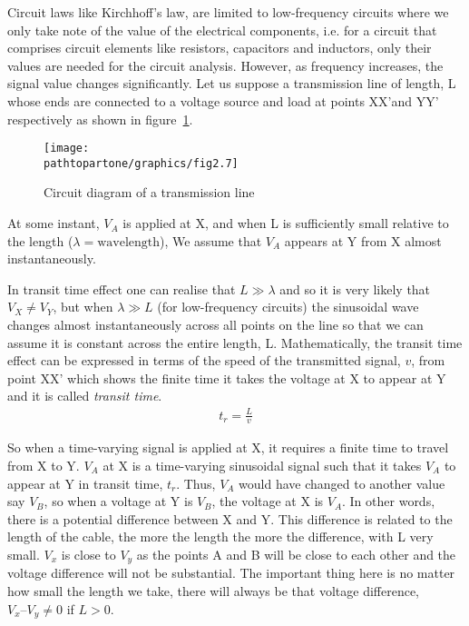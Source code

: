 Circuit laws like Kirchhoff’s law, are limited to low-frequency circuits where we only take note of the value of the electrical components, i.e. for a circuit that comprises circuit elements like resistors, capacitors and inductors, only their values are needed for the circuit analysis. However, as frequency increases, the signal value changes significantly. Let us suppose a transmission line of length, L whose ends are connected to a voltage source and load at points XX'and YY' respectively as shown in figure~\ref{fig:first}.
\begin{figure}[h]
\centering
\texttt{[image: \\pathtopartone/graphics/fig2.7]}
\caption{Circuit diagram of a transmission line}
\label{fig:first}
\end{figure}

At some instant, $ V_{A} $ is applied at X, and when L is sufficiently small relative to the length ($  \lambda = \text{wavelength} $), We assume that $ V_{A} $ appears at Y from X almost instantaneously.

In transit time effect one can realise that $ L \gg\lambda$ and so it is very likely that $ V_{X} \neq V_{Y} $, but when $  \lambda \gg L  $ (for low-frequency circuits) the sinusoidal wave changes almost instantaneously across all points on the line so that we can assume it is constant across the entire length, L. Mathematically, the transit time effect can be expressed in terms of the speed of the transmitted signal, $v$, from point XX' which shows the finite time it takes the voltage at X to appear at Y and it is called \textit{transit time}.
\begin{align}
t_{r} = \frac{L}{v}
\label{eqn:transittime}
\end{align}

So when a time-varying signal is applied at X, it requires a finite time to travel from X to Y. $ V_{A} $ at X is a time-varying sinusoidal signal such that it takes $ V_{A} $ to appear at Y in transit time, $t_r$. Thus, $ V_{A} $ would have changed to another value say $ V_{B} $, so when a voltage at Y is $ V_{B} $, the voltage at X is $ V_{A} $. In other words, there is a potential difference between X and Y. This difference is related to the length of the cable, the more the length the more the difference, with L very small. $ V_{x} $ is close to $ V_{y} $ as the points A and B will be close to each other and the voltage difference will not be substantial. The important thing here is no matter how small the length we take, there will always be that voltage difference, $ V_{x} – V_{y} \neq 0 $ if $ L > 0 $.

